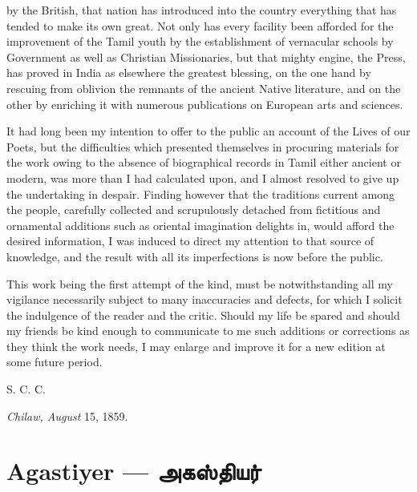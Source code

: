 \documentclass{article}
\newcommand{\TamilBold}[1]{\texttamil{\textbf{#1}}}
\newcommand{\tambold}[1]{\TamilBold{#1}}
\begin{document}
by the British, that nation has introduced into the country everything that has tended to make its own great. Not only has every facility been afforded for the improvement of the Tamil youth by the establishment of vernacular schools by Government as well as Christian Missionaries, but that mighty engine, the Press, has proved in India as elsewhere the greatest blessing, on the one hand by rescuing from oblivion the remnants of the ancient Native literature, and on the other by enriching it with numerous publications on European arts and sciences.

It had long been my intention to offer to the public an account of the Lives of our Poets, but the difficulties which presented themselves in procuring materials for the work owing to the absence of biographical records in Tamil either ancient or modern, was more than I had calculated upon, and I almost resolved to give up the undertaking in despair. Finding however that the traditions current among the people, carefully collected and scrupulously detached from fictitious and ornamental additions such as oriental imagination delights in, would afford the desired information, I was induced to direct my attention to that source of knowledge, and the result with all its imperfections is now before the public.

This work being the first attempt of the kind, must be notwithstanding all my vigilance necessarily subject to many inaccuracies and defects, for which I solicit the indulgence of the reader and the critic. Should my life be spared and should my friends be kind enough to communicate to me such additions or corrections as they think the work needs, I may enlarge and improve it for a new edition at some future period.

\bigskip

S. C. C.

\begin{flushright}\emph{Chilaw, August} 15, 1859.\end{flushright}
\clearpage
\section{Agastiyer --- \tambold{அகஸ்தியர்}}
\end{document}
